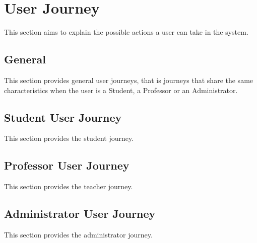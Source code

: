 \section{User Journey}
This section aims to explain the possible actions a user can take in the system. 

\subsection{General}
This section provides general user journeys, that is journeys that share the same 
characteristics when the user is a Student, a Professor or an Administrator.
% 


% 

\subsection{Student User Journey}
This section provides the student journey.




\subsection{Professor User Journey}
This section provides the teacher journey.




\subsection{Administrator User Journey}
This section provides the administrator journey.



